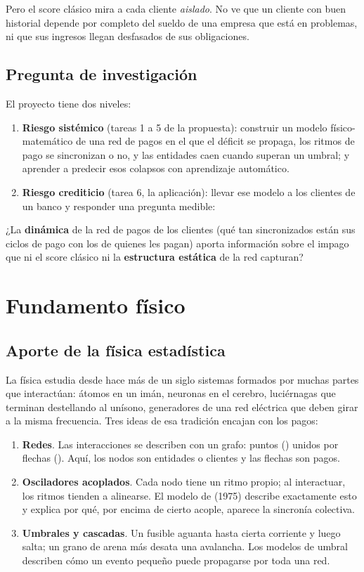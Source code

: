 Pero el score clásico mira a cada cliente \emph{aislado}. No ve que un cliente con buen
historial depende por completo del sueldo de una empresa que está en problemas, ni
que sus ingresos llegan desfasados de sus obligaciones.

\section{Pregunta de investigación}
El proyecto tiene dos niveles:
\begin{enumerate}
\item \textbf{Riesgo sistémico} (tareas 1 a 5 de la propuesta): construir un modelo
físico-matemático de una red de pagos en el que el déficit se propaga, los ritmos de
pago se sincronizan o no, y las entidades caen cuando superan un umbral; y aprender a
predecir esos colapsos con aprendizaje automático.
\item \textbf{Riesgo crediticio} (tarea 6, la aplicación): llevar ese modelo a los
clientes de un banco y responder una pregunta medible:
\end{enumerate}
\begin{clave}
¿La \textbf{dinámica} de la red de pagos de los clientes (qué tan sincronizados están
sus ciclos de pago con los de quienes les pagan) aporta información sobre el impago
que ni el score clásico ni la \textbf{estructura estática} de la red capturan?
\end{clave}

\chapter{Fundamento físico}

\section{Aporte de la física estadística}
La física estudia desde hace más de un siglo sistemas formados por muchas partes que
interactúan: átomos en un imán, neuronas en el cerebro, luciérnagas que terminan
destellando al unísono, generadores de una red eléctrica que deben girar a la misma
frecuencia. Tres ideas de esa tradición encajan con los pagos:

\begin{enumerate}
\item \textbf{Redes}. Las interacciones se describen con un grafo: puntos
() unidos por flechas (). Aquí, los nodos son entidades o
clientes y las flechas son pagos.
\item \textbf{Osciladores acoplados}. Cada nodo tiene un ritmo propio; al
interactuar, los ritmos tienden a alinearse. El modelo de  (1975)
describe exactamente esto y explica por qué, por encima de cierto acople, aparece la
sincronía colectiva.
\item \textbf{Umbrales y cascadas}. Un fusible aguanta hasta cierta corriente y luego
salta; un grano de arena más desata una avalancha. Los modelos de umbral describen
cómo un evento pequeño puede propagarse por toda una red.
\end{enumerate}

